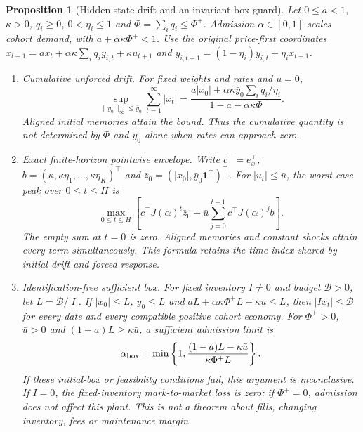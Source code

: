 \documentclass[12pt]{article}
\newtheorem{proposition}[theorem]{Proposition}
\theoremstyle{definition}
\theoremstyle{remark}
\begin{document}
\begin{proposition}[Hidden-state drift and an invariant-box guard]\label{prop:driftguard}
Let $0\le a<1$, $\kappa>0$, $q_i\ge0$, $0<\eta_i\le1$ and $\Phi=\sum_iq_i\le\Phi^+$. Admission $\alpha\in[0,1]$ scales cohort demand, with $a+\alpha\kappa\Phi^+<1$. Use the original price-first coordinates $x_{t+1}=ax_t+\alpha\kappa\sum_iq_iy_{i,t}+\kappa u_{t+1}$ and $y_{i,t+1}=(1-\eta_i)y_{i,t}+\eta_ix_{t+1}$.
\begin{enumerate}[label=(\roman*)]
\item \emph{Cumulative unforced drift.} For fixed weights and rates and $u=0$,
\begin{equation}\label{eq:driftenv}
\sup_{\|y_0\|_\infty\le\bar y_0}\sum_{t=1}^\infty|x_t|
=\frac{a|x_0|+\alpha\kappa\bar y_0\sum_iq_i/\eta_i}{1-a-\alpha\kappa\Phi}.
\end{equation}
Aligned initial memories attain the bound. Thus the cumulative quantity is not determined by $\Phi$ and $\bar y_0$ alone when rates can approach zero.
\item \emph{Exact finite-horizon pointwise envelope.} Write $c^\top=e_x^\top$, $b=(\kappa,\kappa\eta_1,\ldots,\kappa\eta_K)^\top$ and $\bar z_0=(|x_0|,\bar y_0\mathbf1^\top)^\top$. For $|u_t|\le\bar u$, the worst-case peak over $0\le t\le H$ is
\begin{equation}\label{eq:driftpeak}
\max_{0\le t\le H}\left[c^\top J(\alpha)^t\bar z_0+\bar u\sum_{j=0}^{t-1}c^\top J(\alpha)^jb\right].
\end{equation}
The empty sum at $t=0$ is zero. Aligned memories and constant shocks attain every term simultaneously. This formula retains the time index shared by initial drift and forced response.
\item \emph{Identification-free sufficient box.} For fixed inventory $I\ne0$ and budget $\mathcal B>0$, let $L=\mathcal B/|I|$. If $|x_0|\le L$, $\bar y_0\le L$ and $aL+\alpha\kappa\Phi^+L+\kappa\bar u\le L$, then $|I x_t|\le\mathcal B$ for every date and every compatible positive cohort economy. For $\Phi^+>0$, $\bar u>0$ and $(1-a)L\ge\kappa\bar u$, a sufficient admission limit is
\begin{equation}\label{eq:alphabox}
\alpha_{\rm box}=\min\left\{1,\frac{(1-a)L-\kappa\bar u}{\kappa\Phi^+L}\right\}.
\end{equation}
If these initial-box or feasibility conditions fail, this argument is inconclusive. If $I=0$, the fixed-inventory mark-to-market loss is zero; if $\Phi^+=0$, admission does not affect this plant. This is not a theorem about fills, changing inventory, fees or maintenance margin.
\end{enumerate}
\end{proposition}
\end{document}
